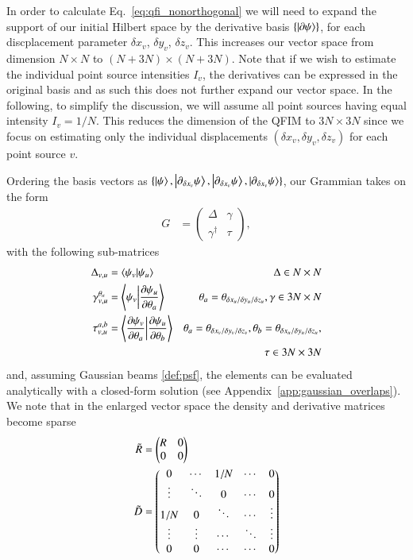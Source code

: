 \documentclass[reprint,amsmath,amssymb,aps,pra,floatfix]{revtex4-2}
\begin{document}
In order to calculate Eq.~\eqref{eq:qfi_nonorthogonal} we will need to expand the support of our initial Hilbert space by the derivative basis $\{\ket{\partial \psi}\}$, for each discplacement parameter $\delta x_v$, $\delta y_v$, $\delta z_v$. This increases our vector space from dimension $N \times N$ to $(N+3N) \times (N+3N)$. Note that if we wish to estimate the individual point source intensities $I_v$, the derivatives can be expressed in the original basis and as such this does not further expand our vector space. In the following, to simplify the discussion, we will assume all point sources having equal intensity $I_v=1/N$. This reduces the dimension of the QFIM to $3N \times 3N$ since we focus on estimating only the individual displacements $(\delta x_v,\delta y_v,\delta z_v)$ for each point source $v$.

Ordering the basis vectors as $\{\ket{\psi}, \ket{\partial_{\delta x_v} \psi}, \ket{\partial_{\delta x_v} \psi}, |{\partial_{\delta x_v} \psi}\rangle\}$, our Grammian takes on the form
\begin{align}
    G &= \begin{pmatrix}
    \Delta & \gamma  \\
    \gamma^\dagger & \tau
    \end{pmatrix},
\end{align}
with the following sub-matrices
\begin{align}
    \Delta_{v,u} &= \braket{\psi_v}{\psi_u} & \Delta \in N\times N \label{eq:delta} \\
    \gamma^{\theta_a}_{v,u} &= \braket{\psi_v}{ \frac{\partial \psi_u}{\partial \theta_a}} & \theta_a = \theta_{\delta x_u / \delta y_u / \delta z_u}, \gamma \in 3N \times N \label{eq:gamma}\\
    \tau^{a,b}_{v,u} &= \braket{\frac{\partial \psi_v}{\partial \theta_a}}{ \frac{\partial \psi_u}{\partial \theta_b}} & \theta_a = \theta_{\delta x_v / \delta y_v / \delta z_v}, \theta_b = \theta_{\delta x_u / \delta y_u / \delta z_u} , \nonumber \\
    && \tau \in 3N \times 3N \label{eq:tau}
\end{align}
and, assuming Gaussian beams \eqref{def:psf}, the elements can be evaluated analytically with a closed-form solution (see Appendix~\ref{app:gaussian_overlaps}). We note that in the enlarged vector space the density and derivative matrices become sparse
\begin{align}
    \Tilde{R} &= \begin{pmatrix}
    R & 0 \\
    0 & 0
    \end{pmatrix}\\
    \Tilde{D} &= \begin{pmatrix}
    0 & \cdots & 1/N & \cdots & 0 \\
    \vdots & \ddots & 0 & \cdots & 0 \\
    1/N & 0 & \ddots & \cdots & \vdots \\
    \vdots & \vdots & \cdots & \ddots & \vdots \\
    0 & 0 & \cdots & \cdots & 0 \\
    \end{pmatrix}
\end{align}
\end{document}
